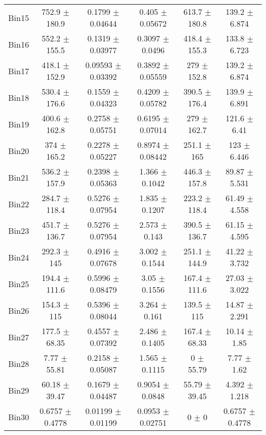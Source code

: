 \begin{tabular}{@{\extracolsep{4pt}}lccccc@{}}
     Bin15 & 752.9 $\pm$ 180.9 & 0.1799 $\pm$ 0.04644 & 0.405 $\pm$ 0.05672 & 613.7 $\pm$ 180.8 & 139.2 $\pm$ 6.874 \\ 
     Bin16 & 552.2 $\pm$ 155.5 & 0.1319 $\pm$ 0.03977 & 0.3097 $\pm$ 0.0496 & 418.4 $\pm$ 155.3 & 133.8 $\pm$ 6.723 \\ 
     Bin17 & 418.1 $\pm$ 152.9 & 0.09593 $\pm$ 0.03392 & 0.3892 $\pm$ 0.05559 & 279 $\pm$ 152.8 & 139.2 $\pm$ 6.874 \\ 
     Bin18 & 530.4 $\pm$ 176.6 & 0.1559 $\pm$ 0.04323 & 0.4209 $\pm$ 0.05782 & 390.5 $\pm$ 176.4 & 139.9 $\pm$ 6.891 \\ 
     Bin19 & 400.6 $\pm$ 162.8 & 0.2758 $\pm$ 0.05751 & 0.6195 $\pm$ 0.07014 & 279 $\pm$ 162.7 & 121.6 $\pm$ 6.41 \\ 
     Bin20 & 374 $\pm$ 165.2 & 0.2278 $\pm$ 0.05227 & 0.8974 $\pm$ 0.08442 & 251.1 $\pm$ 165 & 123 $\pm$ 6.446 \\ 
     Bin21 & 536.2 $\pm$ 157.9 & 0.2398 $\pm$ 0.05363 & 1.366 $\pm$ 0.1042 & 446.3 $\pm$ 157.8 & 89.87 $\pm$ 5.531 \\ 
     Bin22 & 284.7 $\pm$ 118.4 & 0.5276 $\pm$ 0.07954 & 1.835 $\pm$ 0.1207 & 223.2 $\pm$ 118.4 & 61.49 $\pm$ 4.558 \\ 
     Bin23 & 451.7 $\pm$ 136.7 & 0.5276 $\pm$ 0.07954 & 2.573 $\pm$ 0.143 & 390.5 $\pm$ 136.7 & 61.15 $\pm$ 4.595 \\ 
     Bin24 & 292.3 $\pm$ 145 & 0.4916 $\pm$ 0.07678 & 3.002 $\pm$ 0.1544 & 251.1 $\pm$ 144.9 & 41.22 $\pm$ 3.732 \\ 
     Bin25 & 194.4 $\pm$ 111.6 & 0.5996 $\pm$ 0.08479 & 3.05 $\pm$ 0.1556 & 167.4 $\pm$ 111.6 & 27.03 $\pm$ 3.022 \\ 
     Bin26 & 154.3 $\pm$ 115 & 0.5396 $\pm$ 0.08044 & 3.264 $\pm$ 0.161 & 139.5 $\pm$ 115 & 14.87 $\pm$ 2.291 \\ 
     Bin27 & 177.5 $\pm$ 68.35 & 0.4557 $\pm$ 0.07392 & 2.486 $\pm$ 0.1405 & 167.4 $\pm$ 68.33 & 10.14 $\pm$ 1.85 \\ 
     Bin28 & 7.77 $\pm$ 55.81 & 0.2158 $\pm$ 0.05087 & 1.565 $\pm$ 0.1115 & 0 $\pm$ 55.79 & 7.77 $\pm$ 1.62 \\ 
     Bin29 & 60.18 $\pm$ 39.47 & 0.1679 $\pm$ 0.04487 & 0.9054 $\pm$ 0.0848 & 55.79 $\pm$ 39.45 & 4.392 $\pm$ 1.218 \\ 
     Bin30 & 0.6757 $\pm$ 0.4778 & 0.01199 $\pm$ 0.01199 & 0.0953 $\pm$ 0.02751 & 0 $\pm$ 0 & 0.6757 $\pm$ 0.4778 \\ 
\hline\hline
  \end{tabular}

